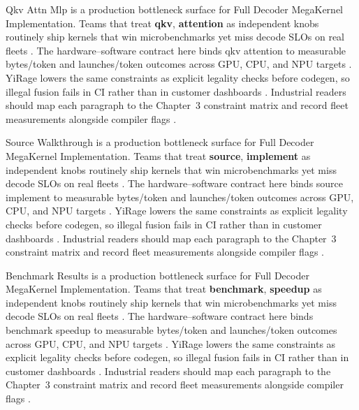 Qkv Attn Mlp is a production bottleneck surface for Full Decoder MegaKernel Implementation. Teams that treat \textbf{qkv}, \textbf{attention} as independent knobs routinely ship kernels that win microbenchmarks yet miss decode SLOs on real fleets \citep{amd2024xdna,dao2022flashattention}. The hardware--software contract here binds qkv attention to measurable bytes/token and launches/token outcomes across GPU, CPU, and NPU targets \citep{amd2024aie,kwon2023vllm}. YiRage lowers the same constraints as explicit legality checks before codegen, so illegal fusion fails in CI rather than in customer dashboards \citep{dlbook,nvidia2024cudagraphs}. Industrial readers should map each paragraph to the Chapter~3 constraint matrix and record fleet measurements alongside compiler flags \citep{dao2022flashattention,liu2024deepseekv3}.

Source Walkthrough is a production bottleneck surface for Full Decoder MegaKernel Implementation. Teams that treat \textbf{source}, \textbf{implement} as independent knobs routinely ship kernels that win microbenchmarks yet miss decode SLOs on real fleets \citep{amd2024aie,kwon2023vllm}. The hardware--software contract here binds source implement to measurable bytes/token and launches/token outcomes across GPU, CPU, and NPU targets \citep{dlbook,nvidia2024cudagraphs}. YiRage lowers the same constraints as explicit legality checks before codegen, so illegal fusion fails in CI rather than in customer dashboards \citep{dao2022flashattention,liu2024deepseekv3}. Industrial readers should map each paragraph to the Chapter~3 constraint matrix and record fleet measurements alongside compiler flags \citep{kwon2023vllm,patel2025llminference}.

Benchmark Results is a production bottleneck surface for Full Decoder MegaKernel Implementation. Teams that treat \textbf{benchmark}, \textbf{speedup} as independent knobs routinely ship kernels that win microbenchmarks yet miss decode SLOs on real fleets \citep{dlbook,nvidia2024cudagraphs}. The hardware--software contract here binds benchmark speedup to measurable bytes/token and launches/token outcomes across GPU, CPU, and NPU targets \citep{dao2022flashattention,liu2024deepseekv3}. YiRage lowers the same constraints as explicit legality checks before codegen, so illegal fusion fails in CI rather than in customer dashboards \citep{kwon2023vllm,patel2025llminference}. Industrial readers should map each paragraph to the Chapter~3 constraint matrix and record fleet measurements alongside compiler flags \citep{nvidia2024cudagraphs,taxbreak2026}.


